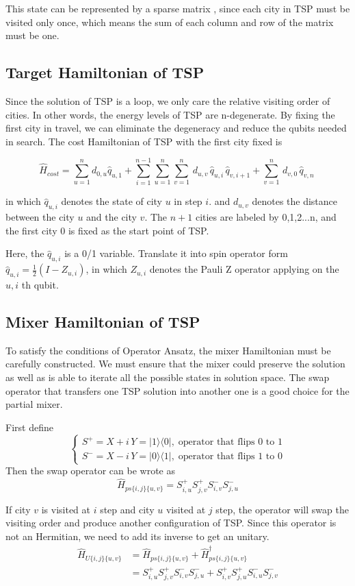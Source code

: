 \documentclass[aps,pra,twocolumn,superscriptaddress]{revtex4-2}
\begin{document}
This state can be represented by a sparse matrix , since each city in TSP must be visited only once, which means the sum of each column and row of the matrix must be one.

\subsection{Target Hamiltonian of TSP}
Since the solution of TSP is a loop, we only care the relative visiting order of cities. In other words, the energy levels of TSP are n-degenerate. By fixing the first city in travel, we can eliminate the degeneracy and reduce the qubits needed in search. The cost Hamiltonian of TSP with the first city fixed is 

$$
\hat H_{cost}=\sum_{u=1}^{n}d_{0,u}\hat q_{u,1}+\sum_{i=1}^{n-1}\sum_{u=1}^{n}\sum_{v=1}^{n}\,d_{u,v}\, \hat q_{u,i}\, \hat q_{v,i+1}+\sum_{v=1}^{n}\,d_{v,0}\,\hat q_{v,n}\
$$

in which $\hat q_{u,i}$ denotes the state of city $u$ in step $i$. 
and $d_{u,v}$ denotes the distance between the city $u$ and the city $v$. The $n+1$ cities are labeled by {0,1,2...n}, and the first city 0 is fixed as the start point of TSP.

Here, the $\hat q_{u,i}$ is a 0/1 variable. Translate it into spin operator form $\hat q_{u,i}=\frac{1}{2}(I-Z_{u,i})$, in which $Z_{u,i}$ denotes the Pauli Z operator applying on the ${u,i}$ th qubit.

\subsection{Mixer Hamiltonian of TSP}
To satisfy the conditions of Operator Ansatz, the mixer Hamiltonian must be carefully constructed. We must ensure that the mixer could preserve the solution as well as is able to iterate all the possible states in solution space. The swap operator that transfers one TSP solution into another one is a good choice for the partial mixer.

First define
$$
\begin{cases}
S^+=X+i\,Y=|1\rangle\langle 0|,\; \text{operator that flips 0 to 1}\\
S^-=X-i\, Y=|0\rangle\langle 1|,\; \text{operator that flips 1 to 0}
\end{cases}
$$
Then the swap operator can be wrote as
$$
\hat H_{ps\{i,j\}\{u,v\}}=S^+_{i,u} S^+_{j,v} S^-_{i,v} S^-_{j,u}
$$

If city $v$ is visited at $i$ step and city $u$ visited at $j$ step, the operator will swap the visiting order and produce another configuration of TSP. Since this operator is not an Hermitian, we need to add its inverse to get an unitary.
$$
\begin{aligned}
   \hat H_{U\{i,j\}\{u,v\}}&= \hat H_{ps\{i,j\}\{u,v\}}+\hat H_{ps\{i,j\}\{u,v\}}^\dagger \\
&=S^+_{i,u} S^+_{j,v} S^-_{i,v} S^-_{j,u}+S^+_{i,v} S^+_{j,u} S^-_{i,u} S^-_{j,v}
\end{aligned}
$$
\end{document}
